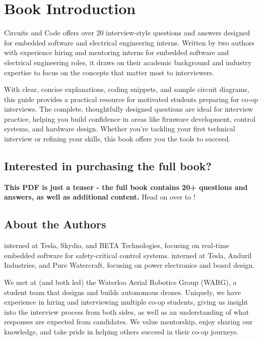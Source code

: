 \documentclass[main.tex]{subfiles}
\begin{document}
\section{Book Introduction}

Circuits and Code offers over 20 interview-style questions and answers designed for embedded software and electrical engineering interns. Written by two authors with experience hiring and mentoring interns for embedded software and electrical engineering roles, it draws on their academic background and industry expertise to focus on the concepts that matter most to interviewers. \newline

\newnoindentpara With clear, concise explanations, coding snippets, and sample circuit diagrams, this guide provides a practical resource for motivated students preparing for co-op interviews. The complete, thoughtfully designed questions are ideal for interview practice, helping you build confidence in areas like firmware development, control systems, and hardware design. Whether you’re tackling your first technical interview or refining your skills, this book offers you the tools to succeed.

\subsection{Interested in purchasing the full book?}
\textbf{This PDF is just a teaser - the full book contains 20+ questions and answers, as well as additional content.} Head on over to !

\subsection{About the Authors}
 interned at Tesla, Skydio, and BETA Technologies, focusing on real-time embedded software for safety-critical control systems.
\newline
\newline
{} interned at Tesla, Anduril Industries, and Pure Watercraft, focusing on power electronics and board design. \newline

\newnoindentpara We met at (and both led) the Waterloo Aerial Robotics Group (WARG), a student team that designs and builds autonomous drones. Uniquely, we have experience in hiring and interviewing multiple co-op students, giving us insight into the interview process from both sides, as well as an understanding of what responses are expected from candidates. We value mentorship, enjoy sharing our knowledge, and take pride in helping others succeed in their co-op journeys.
\end{document}
